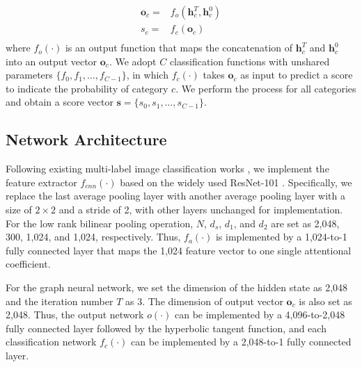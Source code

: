\documentclass[10pt,twocolumn,letterpaper]{article}
\begin{document}
\begin{equation}
   \begin{split}
    \mathbf{o}_c=&f_o(\mathbf{h}_{c}^T, \mathbf{h}_{c}^0) \\
    s_c=&f_c(\mathbf{o}_c) \\
   \end{split}
   \label{eq:cls}
\end{equation}
where $f_o(\cdot)$ is an output function that maps the concatenation of $\mathbf{h}_{c}^T$ and $\mathbf{h}_{c}^0$ into an output vector $\mathbf{o}_c$. We adopt $C$ classification functions with unshared parameters $\{f_0, f_1, \dots, f_{C-1}\}$, in which $f_c(\cdot)$ takes $\mathbf{o}_c$ as input to predict a score to indicate the probability of category $c$. We perform the process for all categories and obtain a score vector $\mathbf{s}=\{s_0, s_1, \dots, s_{C-1}\}$.

\subsection{Network Architecture}
Following existing multi-label image classification works \cite{zhu2017learning}, we implement the feature extractor $f_{cnn}(\cdot)$ based on the widely used ResNet-101 \cite{he2016deep}. Specifically, we replace the last average pooling layer with another average pooling layer with a size of $2\times 2$ and a stride of 2, with other layers unchanged for implementation. For the low rank bilinear pooling operation, $N$, $d_s$, $d_1$, and $d_2$ are set as 2,048, 300, 1,024, and 1,024, respectively. Thus, $f_a(\cdot)$ is implemented by a 1,024-to-1 fully connected layer that maps the 1,024 feature vector to one single attentional coefficient.

For the graph neural network, we set the dimension of the hidden state as 2,048 and the iteration number $T$ as 3. The dimension of output vector $\mathbf{o}_c$ is also set as 2,048. Thus, the output network $o(\cdot)$ can be implemented by a 4,096-to-2,048 fully connected layer followed by the hyperbolic tangent function, and each classification network $f_c(\cdot)$ can be implemented by a 2,048-to-1 fully connected layer.
\end{document}
